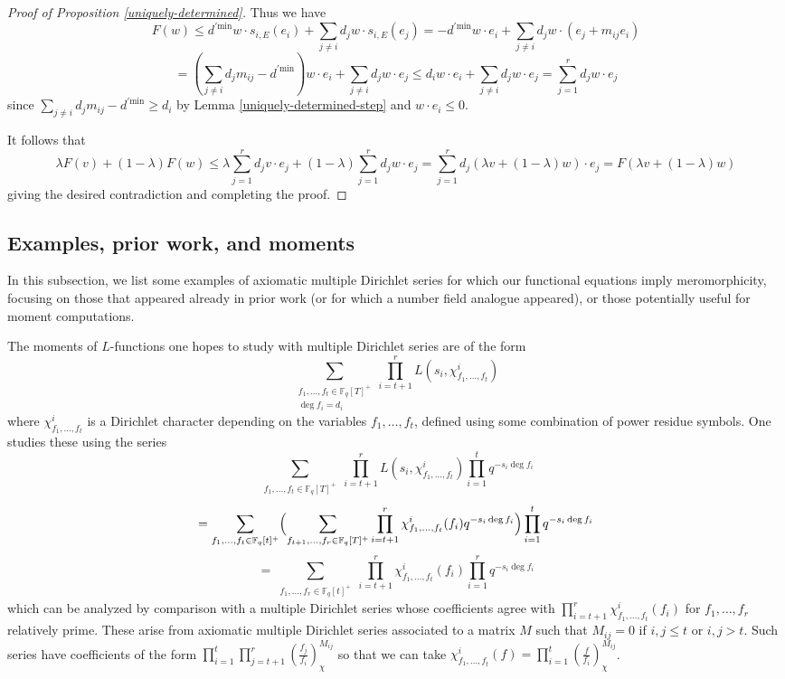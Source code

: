 \documentclass[11pt,letterpaper]{article}
\theoremstyle{definition}
\theoremstyle{remark}
\numberwithin{equation}{section}
\theoremstyle{dotless}
\begin{document}
\begin{proof}[Proof of Proposition \ref{uniquely-determined}]
Thus we have
\[ F(w) \leq  d^{'\mathrm{min}} w \cdot s_{i,E} (e_i) + \sum_{j \neq i}  d_j w \cdot s_{i, E} (e_j) = - d^{'\mathrm{min}}  w \cdot e_i + \sum_{j \neq i} d_j w \cdot (e_j + m_{ij} e_i)\] \[ = (\sum_{j \neq i} d_j m_{ij}  - d^{' \textrm {min}} ) w\cdot e_i + \sum_{j\neq i } d_j w \cdot e_j  \leq  d_i  w \cdot e_i + \sum_{j\neq i } d_j w \cdot e_j = \sum_{j=1}^r d_j w \cdot e_j \]
since  $\sum_{j \neq i} d_j m_{ij}  - d^{' \textrm {min}} \geq d_i $ by  Lemma \ref{uniquely-determined-step} and $w\cdot e_i \leq 0$.

It follows that
\[\lambda F(v) + (1-\lambda) F(w) \leq \lambda \sum_{j=1}^r d_j v \cdot e_j + (1-\lambda) \sum_{j=1}^r d_j w \cdot e_j = \sum_{j=1}^r d_j  ( \lambda v + (1-\lambda )w ) \cdot e_j =F(\lambda v + (1-\lambda) w)\] giving the desired contradiction and completing the proof. \end{proof} 






\subsection{Examples, prior work, and moments}

In this subsection, we list some examples of axiomatic multiple Dirichlet series for which our functional equations imply meromorphicity, focusing on those that appeared already in prior work (or for which a number field analogue appeared), or those potentially useful for moment computations.

The moments of $L$-functions one hopes to study with multiple Dirichlet series are of the form \[\sum_{\substack{ f_1,\dots, f_t \in \mathbb F_q[T]^+\\ \deg f_i = d_i }} \prod_{i=t+1}^{r} L(s_i, \chi^i_{ f_1,\dots,f_t}) \] where $\chi^i_{f_1,\dots,f_t}$ is a Dirichlet character depending on the variables $f_1,\dots, f_t$, defined using some combination of power residue symbols. One studies these using the series
\[\sum_{\substack{ f_1,\dots, f_t \in \mathbb F_q[T]^+}} \prod_{i=t+1}^{r} L(s_i, \chi^i_{ f_1,\dots,f_t}) \prod_{i=1}^t q^{ - s_i \deg f_i} \] \[ =\sum_{\substack{ f_1,\dots, f_t} \in \mathbb F_q[t]^+}\Bigl( \sum_{ f_{t+1},\dots, f_r \in \mathbb F_q[T]^+ }\prod_{i=t+1}^{r} \chi^i_{f_1,\dots, f_t} ( f_i ) q^{ - s_i \deg f_i} \Bigr) \prod_{i=1}^t q^{ - s_i \deg f_i}  \] \[= \sum_{\substack{ f_1,\dots, f_r \in \mathbb F_q[t]^+}} \prod_{i=t+1}^{r} \chi^i_{f_1,\dots, f_t} ( f_i )  \prod_{i=1}^r q^{ - s_i \deg f_i}\]
which can be analyzed by comparison with a multiple Dirichlet series whose coefficients agree with $\prod_{i=t+1}^{r} \chi^i_{f_1,\dots, f_t} ( f_i )$ for $f_1,\dots, f_r$ relatively prime. These arise from axiomatic multiple Dirichlet series associated to a matrix $M$ such that $M_{ij}=0$ if $i,j \leq t$ or $i,j >t$. Such series have coefficients of the form $\prod_{ i=1}^t \prod_{j=t+1}^r \left( \frac{f_j}{f_i} \right)_\chi^{M_{ij}}$ so that we can take $\chi^i_{f_1,\dots,f_t} (f) = \prod_{i=1}^t \left(\frac{f}{f_i}\right)_{\chi}^{M_{ij}}$.
\end{document}
